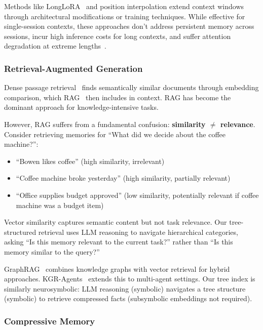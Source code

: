 \documentclass{article}
\begin{document}
Methods like LongLoRA~\cite{chen2023longlora} and position interpolation extend context windows through architectural modifications or training techniques. While effective for single-session contexts, these approaches don't address persistent memory across sessions, incur high inference costs for long contexts, and suffer attention degradation at extreme lengths~\cite{tai2022retrieval}.

\subsubsection{Retrieval-Augmented Generation}

Dense passage retrieval~\cite{karpukhin2020dense} finds semantically similar documents through embedding comparison, which RAG~\cite{lewis2020retrieval} then includes in context. RAG has become the dominant approach for knowledge-intensive tasks.

However, RAG suffers from a fundamental confusion: \textbf{similarity $\neq$ relevance}. Consider retrieving memories for ``What did we decide about the coffee machine?'':

\begin{itemize}[leftmargin=*]
    \item ``Bowen likes coffee'' (high similarity, irrelevant)
    \item ``Coffee machine broke yesterday'' (high similarity, partially relevant)  
    \item ``Office supplies budget approved'' (low similarity, potentially relevant if coffee machine was a budget item)
\end{itemize}

Vector similarity captures semantic content but not task relevance. Our tree-structured retrieval uses LLM reasoning to navigate hierarchical categories, asking ``Is this memory relevant to the current task?'' rather than ``Is this memory similar to the query?''

GraphRAG~\cite{edge2024graphrag} combines knowledge graphs with vector retrieval for hybrid approaches. KGR-Agents~\cite{wang2024kgr} extends this to multi-agent settings. Our tree index is similarly neurosymbolic: LLM reasoning (symbolic) navigates a tree structure (symbolic) to retrieve compressed facts (subsymbolic embeddings not required).

\subsubsection{Compressive Memory}
\end{document}
